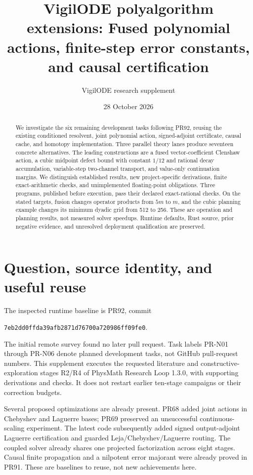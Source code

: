 \documentclass[aps,pra,reprint,onecolumn,11pt,notitlepage,nofootinbib]{revtex4-2}
\begin{document}
\title{VigilODE polyalgorithm extensions:
Fused polynomial actions, finite-step error constants, and causal certification}
\author{VigilODE research supplement}
\noaffiliation
\date{28 October 2026}
\begin{abstract}
We investigate the six remaining development tasks following PR92, reusing
the existing conditioned resolvent, joint polynomial action, signed-adjoint
certificate, causal cache, and homotopy implementation. Three parallel theory
lanes produce seventeen concrete alternatives. The leading constructions are
a fused vector-coefficient Clenshaw action, a cubic midpoint defect bound with
constant $1/12$ and rational decay accumulation, variable-step two-channel
transport, and value-only continuation margins. We distinguish established
results, new project-specific derivations, finite exact-arithmetic checks,
and unimplemented floating-point obligations. Three programs, published before
execution, pass their declared exact-rational checks. On the stated targets,
fusion changes operator products from $5m$ to $m$, and the cubic planning
example changes its minimum dyadic grid from 512 to 256. These are operation
and planning results, not measured solver speedups. Runtime defaults, Rust
source, prior negative evidence, and unresolved deployment qualification are
preserved.
\end{abstract}
\maketitle

\section{Question, source identity, and useful reuse}
The inspected runtime baseline is PR92, commit
\par\noindent\texttt{7eb2dd0ffda39afb2871d76700a720986ff09fe0}.
\par The initial remote survey
found no later pull request. Task labels PR-N01 through PR-N06 denote planned
development tasks, not GitHub pull-request numbers. This supplement executes
the requested literature and constructive-exploration stages R2/R4 of
PhysMath Research Loop 1.3.0, with supporting derivations and checks. It does
not restart earlier ten-stage campaigns or their correction budgets.

Several proposed optimizations are already present. PR68 added joint actions
in Chebyshev and Laguerre bases; PR69 preserved an unsuccessful continuous-scaling
experiment. The latest code subsequently added signed output-adjoint
Laguerre certification and guarded Leja/Chebyshev/Laguerre routing.
The coupled solver already shares one projected factorization across eight
stages. Causal finite propagation and a nilpotent error majorant were already
proved in PR91. These are baselines to reuse, not new achievements here.
\end{document}
